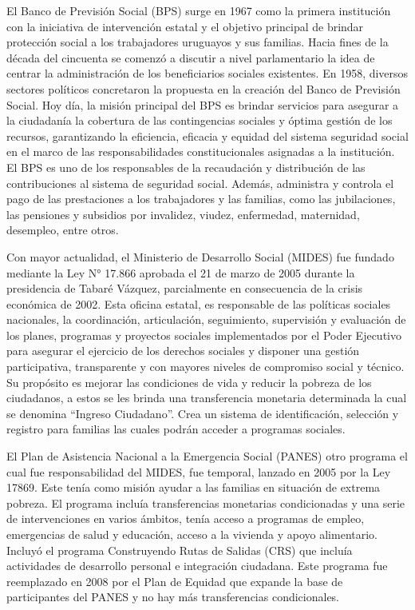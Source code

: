 \documentclass{article}
\begin{document}
El Banco de Previsión Social (BPS) surge en 1967 como la primera institución con la iniciativa de intervención estatal y el objetivo principal de brindar protección social a los trabajadores uruguayos y sus familias. Hacia fines de la década del cincuenta se comenzó a discutir a nivel parlamentario la idea de centrar la administración de los beneficiarios sociales existentes. En 1958, diversos sectores políticos concretaron la propuesta en la creación del Banco de Previsión Social. Hoy día, la misión principal del BPS es brindar servicios para asegurar a la ciudadanía la cobertura de las contingencias sociales y óptima gestión de los recursos, garantizando la eficiencia, eficacia y equidad del sistema seguridad social en el marco de las responsabilidades constitucionales asignadas a la institución. El BPS es uno de los responsables de la recaudación y distribución de las contribuciones al sistema de seguridad social. Además, administra y controla el pago de las prestaciones a los trabajadores y las familias, como las jubilaciones, las pensiones y subsidios por invalidez, viudez, enfermedad, maternidad, desempleo, entre otros.

Con mayor actualidad, el Ministerio de Desarrollo Social (MIDES) fue fundado mediante la Ley N° 17.866 aprobada el 21 de marzo de 2005 durante la presidencia de Tabaré Vázquez, parcialmente en consecuencia de la crisis económica de 2002. Esta oficina estatal, es responsable de las políticas sociales nacionales, la coordinación, articulación, seguimiento, supervisión y evaluación de los planes, programas y proyectos sociales implementados por el Poder Ejecutivo para asegurar el ejercicio de los derechos sociales y disponer una gestión participativa, transparente y con mayores niveles de compromiso social y técnico. Su propósito es mejorar las condiciones de vida y reducir la pobreza de los ciudadanos, a estos se les brinda una transferencia monetaria determinada la cual se denomina “Ingreso Ciudadano”. Crea un sistema de identificación, selección y registro para familias las cuales podrán acceder a programas sociales.

El Plan de Asistencia Nacional a la Emergencia Social (PANES) otro programa el cual fue responsabilidad del MIDES, fue temporal, lanzado en 2005 por la Ley 17869. Este tenía como misión ayudar a las familias en situación de extrema pobreza. El programa incluía transferencias monetarias condicionadas y una serie de intervenciones en varios ámbitos, tenía acceso a programas de empleo, emergencias de salud y educación, acceso a la vivienda y apoyo alimentario. Incluyó el programa Construyendo Rutas de Salidas (CRS) que incluía actividades de desarrollo personal e integración ciudadana. Este programa fue reemplazado en 2008 por el Plan de Equidad que expande la base de participantes del PANES y no hay más transferencias condicionales.
\end{document}
